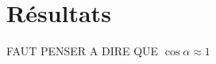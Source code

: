 \section{Résultats}

\begin{minipage}{\linewidth}
    \Huge{FAUT PENSER A DIRE QUE \(\cos{\alpha} \approx 1\)}
\end{minipage}